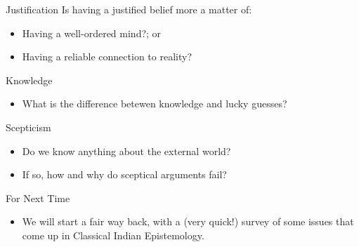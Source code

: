 \documentclass[
  17pt,
  letterpaper,
  ignorenonframetext,
  aspectratio=169,
]{beamer}
\providecommand{\tightlist}{%
  \setlength{\itemsep}{0pt}\setlength{\parskip}{0pt}}\usepackage{longtable,booktabs,array}
\begin{document}
\begin{frame}{Justification}
\protect\hypertarget{justification}{}
Is having a justified belief more a matter of:

\begin{itemize}[<+->]
\tightlist
\item
  Having a well-ordered mind?; or
\item
  Having a reliable connection to reality?
\end{itemize}
\end{frame}

\begin{frame}{Knowledge}
\protect\hypertarget{knowledge}{}
\begin{itemize}[<+->]
\tightlist
\item
  What is the difference betewen knowledge and lucky guesses?
\end{itemize}
\end{frame}

\begin{frame}{Scepticism}
\protect\hypertarget{scepticism}{}
\begin{itemize}[<+->]
\tightlist
\item
  Do we know anything about the external world?
\item
  If so, how and why do sceptical arguments fail?
\end{itemize}
\end{frame}

\begin{frame}{For Next Time}
\protect\hypertarget{for-next-time}{}
\begin{itemize}[<+->]
\tightlist
\item
  We will start a fair way back, with a (very quick!) survey of some
  issues that come up in Classical Indian Epistemology.
\end{itemize}
\end{frame}
\end{document}
